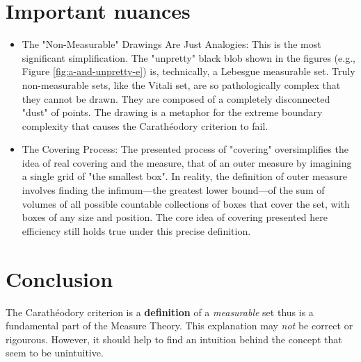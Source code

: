 \documentclass[a4paper]{article}
\begin{document}
\section{Important nuances}%
\label{sec:Important nuances}

\begin{itemize}
    \item 
        The "Non-Measurable" Drawings Are Just Analogies: This is the most significant
        simplification. The "unpretty" black blob shown in the figures (e.g., Figure \ref{fig:a-and-unpretty-e})
        is, technically, a Lebesgue measurable set.  Truly non-measurable sets, like
        the Vitali set, are so pathologically complex that they cannot be drawn. They
        are composed of a completely disconnected "dust" of points. The drawing is a
        metaphor for the extreme boundary complexity that causes the Carathéodory
        criterion to fail.
    \item 
        The Covering Process: The presented process of "covering" oversimplifies the
        idea of real covering and the measure, that of an outer measure by
        imagining a single grid of "the smallest box". In reality, the definition of
        outer measure involves finding the infimum—the greatest lower bound—of the sum
        of volumes of all possible countable collections of boxes that cover the set,
        with boxes of any size and position. The core idea of covering presented here
        efficiency still holds true under this precise definition.
\end{itemize}




\section{Conclusion}%
\label{sec:Conclusion}
The Carathéodory criterion is a \textbf{definition} of a \textit{measurable}
set thus is a fundamental part of the Measure Theory. This explanation may
\textit{not} be correct or rigourous. However, it should help to find an
intuition behind the concept that seem to be unintuitive.
\end{document}

